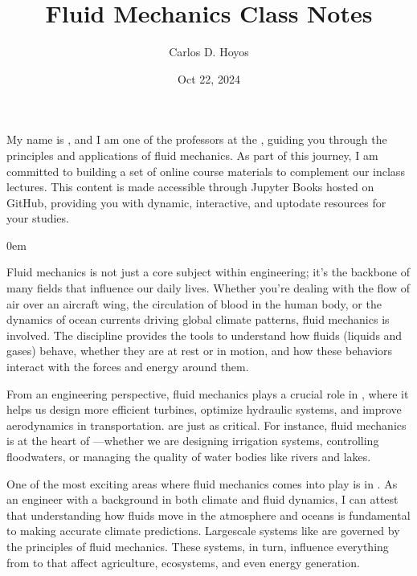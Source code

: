 \documentclass[letterpaper,10pt,english]{jupyterBook}
\title{Fluid Mechanics Class Notes}
\date{Oct 22, 2024}
\author{Carlos D.\@{} Hoyos}
\begin{document}
\pagestyle{empty}
\sphinxmaketitle
\pagestyle{plain}
\sphinxtableofcontents
\pagestyle{normal}
\label{\detokenize{intro::doc}}


\sphinxAtStartPar
My name is , and I am one of the professors at the , guiding you through the principles and applications of fluid mechanics. As part of this journey, I am committed to building a set of online course materials to complement our in\sphinxhyphen{}class lectures. This content is made accessible through Jupyter Books hosted on GitHub, providing you with dynamic, interactive, and up\sphinxhyphen{}to\sphinxhyphen{}date resources for your studies.

\begin{DUlineblock}{0em}
\item[] 
\end{DUlineblock}

\sphinxAtStartPar
Fluid mechanics is not just a core subject within engineering; it’s the backbone of many fields that influence our daily lives. Whether you’re dealing with the flow of air over an aircraft wing, the circulation of blood in the human body, or the dynamics of ocean currents driving global climate patterns, fluid mechanics is involved. The discipline provides the tools to understand how fluids (liquids and gases) behave, whether they are at rest or in motion, and how these behaviors interact with the forces and energy around them.

\sphinxAtStartPar
From an engineering perspective, fluid mechanics plays a crucial role in , where it helps us design more efficient turbines, optimize hydraulic systems, and improve aerodynamics in transportation.  are just as critical. For instance, fluid mechanics is at the heart of —whether we are designing irrigation systems, controlling floodwaters, or managing the quality of water bodies like rivers and lakes.

\sphinxAtStartPar
One of the most exciting areas where fluid mechanics comes into play is in . As an engineer with a background in both climate and fluid dynamics, I can attest that understanding how fluids move in the atmosphere and oceans is fundamental to making accurate climate predictions. Large\sphinxhyphen{}scale systems like  are governed by the principles of fluid mechanics. These systems, in turn, influence everything from  to  that affect agriculture, ecosystems, and even energy generation.
\end{document}
